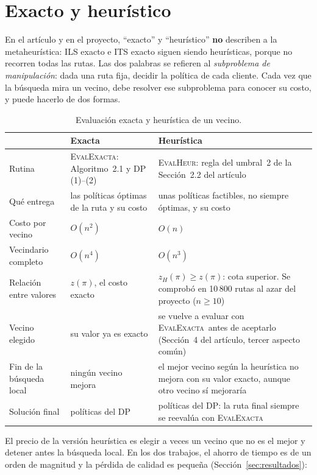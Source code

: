 \documentclass{article}
\newcommand{\EvalE}{\mbox{\textsc{EvalExacta}}}
\newcommand{\EvalH}{\mbox{\textsc{EvalHeur}}}
\begin{document}
\section{Exacto y heurístico}\label{sec:exacto}

En el artículo y en el proyecto, ``exacto'' y ``heurístico'' \textbf{no} describen a la metaheurística: ILS exacto e ITS exacto siguen siendo heurísticas, porque no recorren todas las rutas. Las dos palabras se refieren al \emph{subproblema de manipulación}: dada una ruta fija, decidir la política de cada cliente. Cada vez que la búsqueda mira un vecino, debe resolver ese subproblema para conocer su costo, y puede hacerlo de dos formas.

\begin{table}[H]\centering\small
\caption{Evaluación exacta y heurística de un vecino.}\label{tab:exacto}
\renewcommand{\arraystretch}{1.3}
\begin{tabularx}{\linewidth}{L{3.2cm} Y Y}
\toprule
{} & \textbf{Exacta} & \textbf{Heurística} \\
\midrule
Rutina & \EvalE: Algoritmo~2.1 y DP (1)--(2) & \EvalH: regla del umbral~2 de la Sección~2.2 del artículo \\
Qué entrega & las políticas óptimas de la ruta y su costo & unas políticas factibles, no siempre óptimas, y su costo \\
Costo por vecino & $O(n^2)$ & $O(n)$ \\
Vecindario completo & $O(n^4)$ & $O(n^3)$ \\
Relación entre valores & $z(\pi)$, el costo exacto & $z_H(\pi) \ge z(\pi)$: cota superior. Se comprobó en 10\,800 rutas al azar del proyecto ($n \ge 10$) \\
Vecino elegido & su valor ya es exacto & se vuelve a evaluar con \EvalE\ antes de aceptarlo (Sección~4 del artículo, tercer aspecto común) \\
Fin de la búsqueda local & ningún vecino mejora & el mejor vecino según la heurística no mejora con su valor exacto, aunque otro vecino sí mejoraría \\
Solución final & políticas del DP & políticas del DP: la ruta final siempre se reevalúa con \EvalE \\
\bottomrule
\end{tabularx}
\end{table}

\noindent El precio de la versión heurística es elegir a veces un vecino que no es el mejor y detener antes la búsqueda local. En los dos trabajos, el ahorro de tiempo es de un orden de magnitud y la pérdida de calidad es pequeña (Sección~\ref{sec:resultados}):
\end{document}
